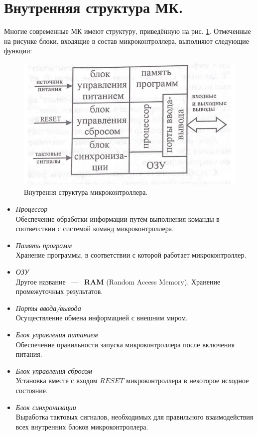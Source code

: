 \section{Внутренняя структура МК.}
Многие современные МК имеют структуру, приведённую на рис. \ref{img::1_2_1}.
Отмеченные на рисунке блоки, входящие в состав микроконтроллера,
выполняют следующие функции:
\begin{figure}[h]
  \includegraphics[width=\linewidth]{./src/pics/1.2.1.png}
  \caption{Внутрення структура микроконтроллера.}
  \label{img::1_2_1}
\end{figure}

\begin{itemize}
  \item \textit{Процессор}\\
  Обеспечение обработки информации путём выполнения команды в соответствии 
  с системой команд микроконтроллера.
  \item \textit{Память программ}\\
  Хранение программы, в соответствии с которой работает микроконтроллер.
  \item \textit{ОЗУ}\\
  Другое название ~---~ \textbf{RAM} (Random Access Memory).
  Хранение промежуточных результатов.
  \item \textit{Порты ввода/вывода}\\
  Осуществление обмена информацией с внешним миром.
  \item \textit{Блок управления питанием}\\
  Обеспечение правильности запуска микроконтроллера
  после включения питания.
  \item \textit{Блок управления сбросом}\\
  Установка вместе с входом $RESET$ микроконтроллера в 
  некоторое исходное состояние.
  \item \textit{Блок синхронизации}\\
  Выработка тактовых сигналов, необходимых для правильного взаимодействия 
  всех внутренних блоков микроконтроллера.
\end{itemize}

